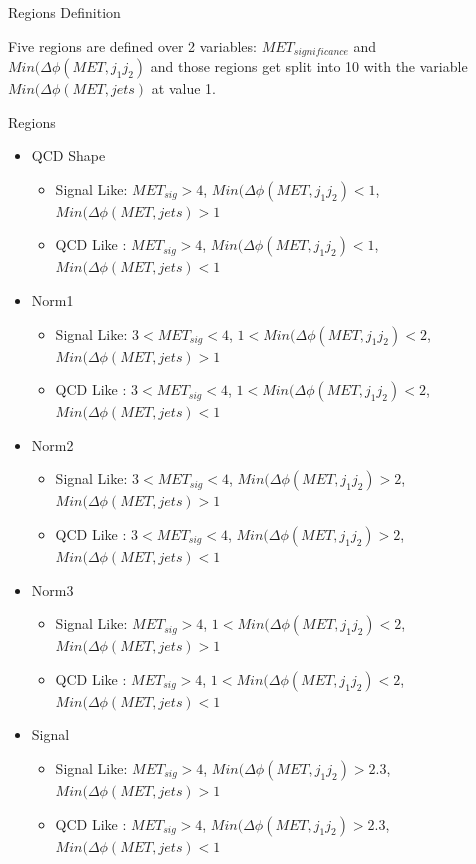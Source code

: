 \documentclass[8pt]{beamer}
\begin{document}
\begin{frame}{Regions Definition}

\begin{center}
Five regions are defined over 2 variables: $MET_{significance}$ and $Min(\Delta\phi(MET,j_{1}j_{2})$ and those regions get split into 10 with the variable $Min(\Delta\phi(MET,jets)$ at value 1.
\end{center}

\begin{block}{Regions}

\begin{itemize}
  \item QCD Shape
  \begin{itemize}
    \item Signal Like: $MET_{sig}>4$, $Min(\Delta\phi(MET,j_{1}j_{2})<1$, $Min(\Delta\phi(MET,jets)>1$
    \item QCD Like   : $MET_{sig}>4$, $Min(\Delta\phi(MET,j_{1}j_{2})<1$, $Min(\Delta\phi(MET,jets)<1$
  \end{itemize}
  \item Norm1
  \begin{itemize}
    \item Signal Like: $3<MET_{sig}<4$, $1<Min(\Delta\phi(MET,j_{1}j_{2})<2$, $Min(\Delta\phi(MET,jets)>1$
    \item QCD Like   : $3<MET_{sig}<4$, $1<Min(\Delta\phi(MET,j_{1}j_{2})<2$, $Min(\Delta\phi(MET,jets)<1$
  \end{itemize}
  \item Norm2
  \begin{itemize}
    \item Signal Like: $3<MET_{sig}<4$, $Min(\Delta\phi(MET,j_{1}j_{2})>2$, $Min(\Delta\phi(MET,jets)>1$
    \item QCD Like   : $3<MET_{sig}<4$, $Min(\Delta\phi(MET,j_{1}j_{2})>2$, $Min(\Delta\phi(MET,jets)<1$
  \end{itemize}
  \item Norm3
  \begin{itemize}
    \item Signal Like: $MET_{sig}>4$, $1<Min(\Delta\phi(MET,j_{1}j_{2})<2$, $Min(\Delta\phi(MET,jets)>1$
    \item QCD Like   : $MET_{sig}>4$, $1<Min(\Delta\phi(MET,j_{1}j_{2})<2$, $Min(\Delta\phi(MET,jets)<1$
  \end{itemize}
  \item Signal
  \begin{itemize}
    \item Signal Like: $MET_{sig}>4$, $Min(\Delta\phi(MET,j_{1}j_{2})>2.3$, $Min(\Delta\phi(MET,jets)>1$
    \item QCD Like   : $MET_{sig}>4$, $Min(\Delta\phi(MET,j_{1}j_{2})>2.3$, $Min(\Delta\phi(MET,jets)<1$
  \end{itemize}
\end{itemize}

\end{block}

\end{frame}
\end{document}
